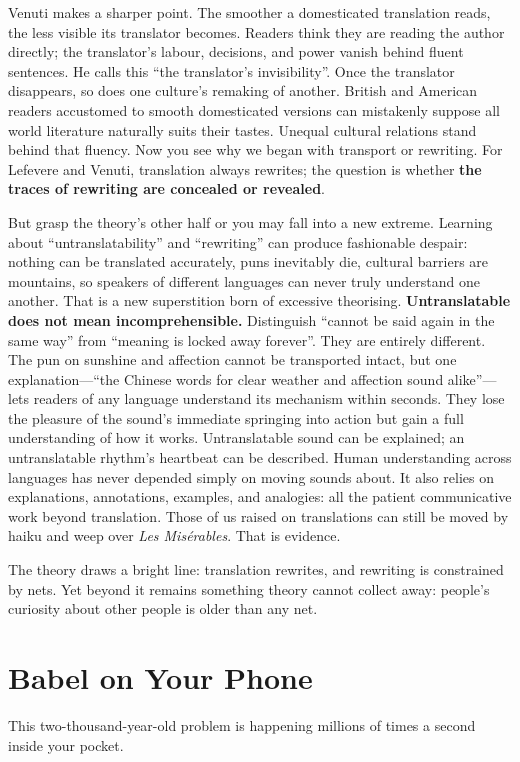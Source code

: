 Venuti makes a sharper point. The smoother a domesticated translation reads, the less visible its translator becomes. Readers think they are reading the author directly; the translator's labour, decisions, and power vanish behind fluent sentences. He calls this ``the translator's invisibility''. Once the translator disappears, so does one culture's remaking of another. British and American readers accustomed to smooth domesticated versions can mistakenly suppose all world literature naturally suits their tastes. Unequal cultural relations stand behind that fluency. Now you see why we began with transport or rewriting. For Lefevere and Venuti, translation always rewrites; the question is whether \textbf{the traces of rewriting are concealed or revealed}.

But grasp the theory's other half or you may fall into a new extreme. Learning about ``untranslatability'' and ``rewriting'' can produce fashionable despair: nothing can be translated accurately, puns inevitably die, cultural barriers are mountains, so speakers of different languages can never truly understand one another. That is a new superstition born of excessive theorising. \textbf{Untranslatable does not mean incomprehensible.} Distinguish ``cannot be said again in the same way'' from ``meaning is locked away forever''. They are entirely different. The pun on sunshine and affection cannot be transported intact, but one explanation---``the Chinese words for clear weather and affection sound alike''---lets readers of any language understand its mechanism within seconds. They lose the pleasure of the sound's immediate springing into action but gain a full understanding of how it works. Untranslatable sound can be explained; an untranslatable rhythm's heartbeat can be described. Human understanding across languages has never depended simply on moving sounds about. It also relies on explanations, annotations, examples, and analogies: all the patient communicative work beyond translation. Those of us raised on translations can still be moved by haiku and weep over \emph{Les Misérables}. That is evidence.

The theory draws a bright line: translation rewrites, and rewriting is constrained by nets. Yet beyond it remains something theory cannot collect away: people's curiosity about other people is older than any net.

\section{Babel on Your Phone}
This two-thousand-year-old problem is happening millions of times a second inside your pocket.

